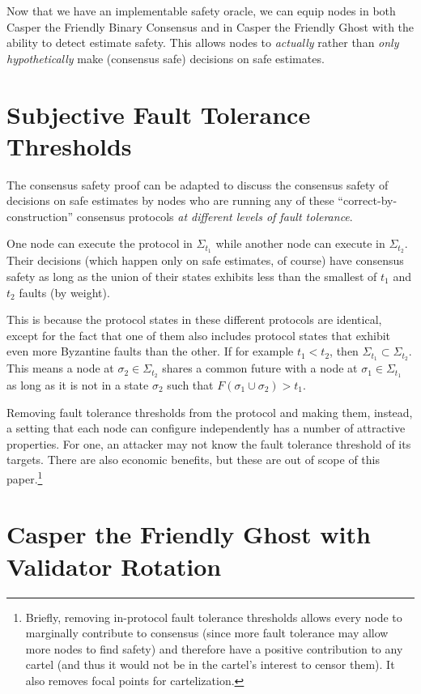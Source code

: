 \documentclass{article}
\theoremstyle{definition}
\begin{document}
Now that we have an implementable safety oracle, we can equip nodes in both Casper the Friendly Binary Consensus and in Casper the Friendly Ghost with the ability to detect estimate safety. This allows nodes to \emph{actually} rather than \emph{only hypothetically} make (consensus safe) decisions on safe estimates.


\section{Subjective Fault Tolerance Thresholds}

The consensus safety proof can be adapted to discuss the consensus safety of decisions on safe estimates by nodes who are running any of these ``correct-by-construction'' consensus protocols \emph{at different levels of fault tolerance}.

One node can execute the protocol in $\Sigma_{t_1}$ while another node can execute in $\Sigma_{t_2}$. Their decisions (which happen only on safe estimates, of course) have consensus safety as long as the union of their states exhibits less than the smallest of $t_1$ and $t_2$ faults (by weight).

This is because the protocol states in these different protocols are identical, except for the fact that one of them also includes protocol states that exhibit even more Byzantine faults than the other. If for example $t_1 < t_2$, then $\Sigma_{t_1} \subset \Sigma_{t_2}$. This means a node at $\sigma_2 \in \Sigma_{t_2}$ shares a common future with a node at $\sigma_1 \in \Sigma_{t_1}$ as long as it is not in a state $\sigma_2$ such that $F(\sigma_1 \cup \sigma_2) > t_1$.

Removing fault tolerance thresholds from the protocol and making them, instead, a setting that each node can configure independently has a number of attractive properties. For one, an attacker may not know the fault tolerance threshold of its targets. There are also economic benefits, but these are out of scope of this paper.\footnote{Briefly, removing in-protocol fault tolerance thresholds allows every node to marginally contribute to consensus (since more fault tolerance may allow more nodes to find safety) and therefore have a positive contribution to any cartel (and thus it would not be in the cartel's interest to censor them). It also removes focal points for cartelization.}

\section{Casper the Friendly Ghost with Validator Rotation}
\end{document}
